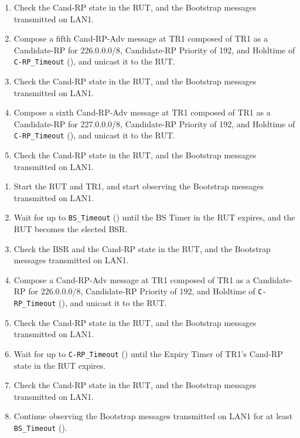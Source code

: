 \documentclass[11pt]{report}
\begin{document}
\begin{enumerate}
  \item Check the Cand-RP state in the RUT, and the Bootstrap
  messages transmitted on LAN1.

  \item Compose a fifth Cand-RP-Adv message at TR1 composed of TR1 as a
   Candidate-RP for 226.0.0.0/8, Candidate-RP Priority of 192, and Holdtime of
   \verb=C-RP_Timeout= ({\PimsmCRPTimeout}), and unicast it to the RUT.

  \item Check the Cand-RP state in the RUT, and the Bootstrap
  messages transmitted on LAN1.

  \item Compose a sixth Cand-RP-Adv message at TR1 composed of TR1 as a
   Candidate-RP for 227.0.0.0/8, Candidate-RP Priority of 192, and Holdtime of
   \verb=C-RP_Timeout= ({\PimsmCRPTimeout}), and unicast it to the RUT.

  \item Check the Cand-RP state in the RUT, and the Bootstrap
  messages transmitted on LAN1.

\end{enumerate}


\begin{enumerate}

  \item Start the RUT and TR1, and start observing the Bootstrap messages
  transmitted on LAN1.

  \item Wait for up to \verb=BS_Timeout= ({\PimsmBSTimeout}) until the BS
  Timer in the RUT expires, and the RUT becomes the elected BSR.

  \item Check the BSR and the Cand-RP state in the RUT, and the Bootstrap
  messages transmitted on LAN1.

  \item Compose a Cand-RP-Adv message at TR1 composed of TR1 as a
   Candidate-RP for 226.0.0.0/8, Candidate-RP Priority of 192, and Holdtime of
   \verb=C-RP_Timeout= ({\PimsmCRPTimeout}), and unicast it to the RUT.

  \item Check the Cand-RP state in the RUT, and the Bootstrap
  messages transmitted on LAN1.

  \item Wait for up to \verb=C-RP_Timeout= ({\PimsmCRPTimeout}) until
  the Expiry Timer of TR1's Cand-RP state in the RUT expires.

  \item Check the Cand-RP state in the RUT, and the Bootstrap
  messages transmitted on LAN1.

  \item Continue observing the Bootstrap messages transmitted on LAN1
  for at least \verb=BS_Timeout= ({\PimsmBSTimeout}).

\end{enumerate}
\end{document}

